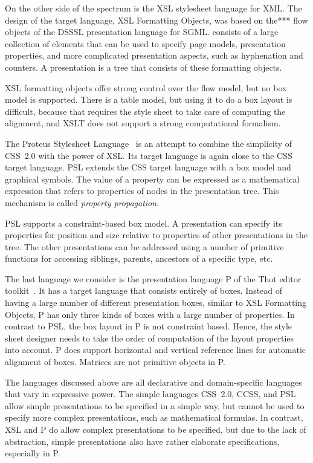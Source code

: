  On the other side of the spectrum is the XSL stylesheet language for XML. The design of the target language, XSL Formatting Objects, was based on the*** flow objects of the DSSSL presentation language for SGML. consists of a large collection of elements that can be used to specify page models, presentation properties, and more complicated presentation aspects, such as hyphenation and counters. A presentation is a tree that consists of these formatting objects. 

XSL formatting objects offer  strong control over the flow model, but no box model is supported. There is a table model, but using it to do a box layout is difficult, because that requires the style sheet to take care of computing the alignment, and XSLT does not support a strong computational formalism.

 The Proteus Stylesheet Language~\cite{marden98psl} is an attempt to combine the simplicity of CSS~2.0 with the power of XSL. Its target language is again close to the CSS target language. PSL extends the CSS target language with a box model and graphical symbols. The value of a property can be expressed as a mathematical expression that refers to properties of nodes in the presentation tree. This mechanism is called {\em property propagation}. 

PSL supports a constraint-based box model. A presentation can specify its properties for position and size relative to properties of other presentations in the tree. The other presentations can be addressed using a number of primitive functions for accessing siblings, parents, ancestors of a specific type, etc.

 The last language we consider is the presentation language P of the Thot editor toolkit~\cite{quint97thot}. It has a target language that consists entirely of boxes. Instead of having a large number of different presentation boxes, similar to XSL Formatting Objects, P has only three kinds of boxes with a large number of properties. In contrast to PSL, the box layout in P is not constraint based. Hence, the style sheet designer needs to take the order of computation of the layout properties into account. P does support horizontal and vertical reference lines for automatic alignment of boxes. Matrices are not primitive objects in P.

 The languages discussed above are all declarative and domain-specific languages that vary in expressive power. The simple languages CSS~2.0, CCSS, and PSL allow simple presentations to be specified in a simple way, but cannot be used to specify more complex presentations, such as mathematical formulas. In contrast, XSL and P do allow complex presentations to be specified, but due to the lack of abstraction, simple presentations also have rather elaborate specifications, especially in P. 

